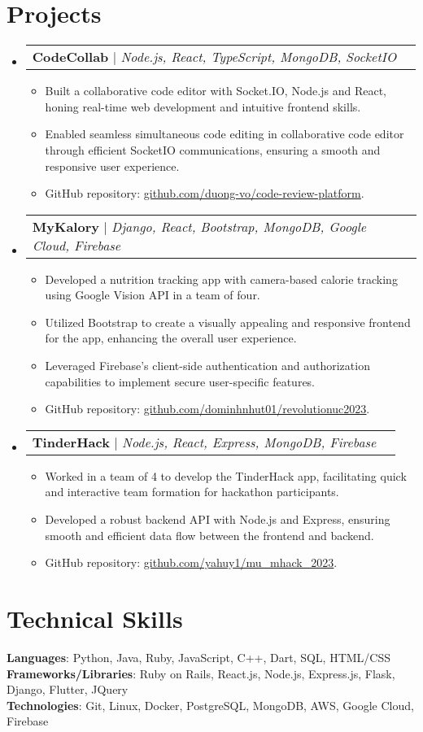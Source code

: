 \documentclass[letterpaper,11pt]{article}
\makeatletter
\newcommand{\resumeItem}[1]{
  \item\small{
    {#1 \vspace{-2pt}}
  }
}
\newcommand{\resumeProjectHeading}[2]{
    \item
    \begin{tabular*}{0.97\textwidth}{l@{\extracolsep{\fill}}r}
      \small#1 & #2 \\
    \end{tabular*}\vspace{-7pt}
}
\newcommand{\resumeSubHeadingListStart}{\begin{itemize}[leftmargin=0.15in, label={}]}
\newcommand{\resumeSubHeadingListEnd}{\end{itemize}}
\newcommand{\resumeItemListStart}{\begin{itemize}}
\newcommand{\resumeItemListEnd}{\end{itemize}\vspace{-5pt}}
\makeatother
\begin{document}
\section{Projects}
    \resumeSubHeadingListStart
      \resumeProjectHeading
          {\textbf{CodeCollab} $|$ \emph{Node.js, React, TypeScript, MongoDB, SocketIO}}{}
          \resumeItemListStart
            \resumeItem{Built a collaborative code editor with Socket.IO, Node.js and React, honing real-time web development and intuitive frontend skills.}
            \resumeItem{Enabled seamless simultaneous code editing in collaborative code editor through efficient SocketIO communications, ensuring a smooth and responsive user experience.}
            \resumeItem{GitHub repository: \href{https://github.com/duong-vo/code-review-platform}{\underline{github.com/duong-vo/code-review-platform}}.}
          \resumeItemListEnd
      \resumeProjectHeading
          {\textbf{MyKalory} $|$ \emph{Django, React, Bootstrap, MongoDB, Google Cloud, Firebase}}{}
          \resumeItemListStart
            \resumeItem{Developed a nutrition tracking app with camera-based calorie tracking using Google Vision API in a team of four.}
            \resumeItem{Utilized Bootstrap to create a visually appealing and responsive frontend for the app, enhancing the overall user experience.}
            \resumeItem{Leveraged Firebase's client-side authentication and authorization capabilities to implement secure user-specific features.}
            \resumeItem{GitHub repository: \href{https://github.com/dominhnhut01/revolutionuc2023}{\underline{github.com/dominhnhut01/revolutionuc2023}}.}
          \resumeItemListEnd
      \resumeProjectHeading
          {\textbf{TinderHack} $|$ \emph{Node.js, React, Express, MongoDB, Firebase}} {}
          \resumeItemListStart
            \resumeItem{Worked in a team of 4 to develop the TinderHack app, facilitating quick and interactive team formation for hackathon participants.}
            \resumeItem{Developed a robust backend API with Node.js and Express, ensuring smooth and efficient data flow between the frontend and backend.}
            \resumeItem{GitHub repository: \href{https://github.com/yahuy1/mu\_mhack\_2023}{\underline{github.com/yahuy1/mu\_mhack\_2023}}.}
          \resumeItemListEnd
    \resumeSubHeadingListEnd




%
\section{Technical Skills}
 \begin{itemize}[leftmargin=0.15in, label={}]
    \small{\item{
     \textbf{Languages}{: Python, Java, Ruby, JavaScript, C++, Dart, SQL, HTML/CSS} \\
     \textbf{Frameworks/Libraries}{: Ruby on Rails, React.js, Node.js, Express.js, Flask, Django, Flutter, JQuery} \\
     \textbf{Technologies}{: Git, Linux, Docker, PostgreSQL, MongoDB, AWS, Google Cloud, Firebase} \\
    }}
 \end{itemize}


\end{document}
